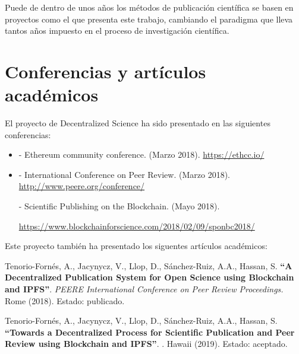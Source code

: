 Puede de dentro de unos años los métodos de publicación científica se basen en
proyectos como el que presenta este trabajo, cambiando el paradigma que lleva
tantos años impuesto en el proceso de investigación científica.


\section{Conferencias y artículos académicos}
\label{sec:conferences-papers}

El proyecto de Decentralized Science ha sido presentado en las siguientes conferencias:

\begin{itemize}
\item {} - Ethereum community conference.  (Marzo
  2018). \url{https://ethcc.io/}

\item {} - International Conference on Peer Review. 
  (Marzo 2018). \url{http://www.peere.org/conference/}

   - Scientific Publishing on the Blockchain.  (Mayo 2018).
  
  
  \url{https://www.blockchainforscience.com/2018/02/09/sponbc2018/}
\end{itemize}

\clearpage

Este proyecto también ha presentado los siguentes artículos académicos:

  Tenorio-Fornés, A., Jacynycz, V., Llop, D., Sánchez-Ruiz, A.A., Hassan, S.
  \textbf{``A Decentralized Publication System for Open Science using Blockchain
    and IPFS''}. \emph{PEERE International Conference on Peer Review
    Proceedings.} Rome (2018). Estado: publicado.

  Tenorio-Fornés, A., Jacynycz, V., Llop, D., Sánchez-Ruiz, A.A., Hassan, S.
  \textbf{``Towards a Decentralized Process for Scientific Publication and Peer
    Review using Blockchain and IPFS''}. . Hawaii (2019). Estado: aceptado.

